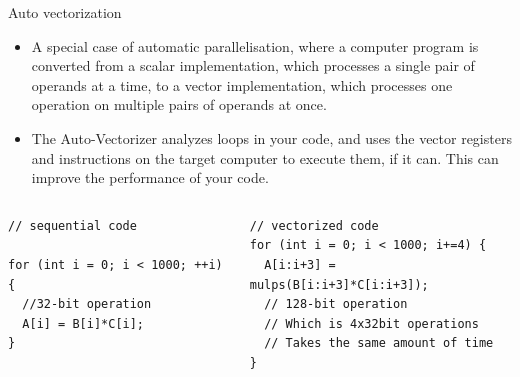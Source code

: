 \documentclass[10pt,times]{beamer}
\begin{document}
\begin{frame}[fragile]{Auto vectorization}
\begin{itemize}
\item A special case of automatic parallelisation, where a computer program is 
converted from a scalar implementation, which processes a single pair of operands at 
a time, to a vector implementation, which processes one operation on multiple pairs 
of operands at once.
\item The Auto-Vectorizer analyzes loops in your code, and uses the
vector registers and instructions on the target computer to execute
them, if it can. This can improve the performance of your code.
\end{itemize}
\begin{columns}
\begin{verbatim}
// sequential code

for (int i = 0; i < 1000; ++i) {
  //32-bit operation
  A[i] = B[i]*C[i]; 
}
\end{verbatim}
\begin{verbatim}
// vectorized code
for (int i = 0; i < 1000; i+=4) {
  A[i:i+3] = mulps(B[i:i+3]*C[i:i+3]);
  // 128-bit operation
  // Which is 4x32bit operations
  // Takes the same amount of time  
}
\end{verbatim}
\end{columns}

\end{frame}
\end{document}
